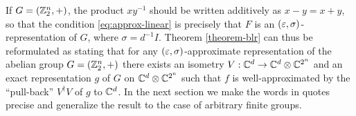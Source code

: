 If  $G=(\mathbb{Z}_2^n,+)$, the product $xy^{-1}$ should be written additively as $x-y=x+y$, so that the condition \eqref{eq:approx-linear} is precisely that $F$ is an $(\varepsilon,\sigma)$-representation of $G$, where  $\sigma = d^{-1}I$. 
Theorem \ref{theorem-blr} can thus be reformulated as stating that for any $(\varepsilon,\sigma)$-approximate representation of the abelian group $G=(\mathbb{Z}_2^n,+)$ there exists an isometry $V:\mathbb{C}^d \to \mathbb{C}^d\otimes \mathbb{C}^{2^n}$ and an exact representation $g$ of $G$ on $\mathbb{C}^d \otimes \mathbb{C}^{2^n}$ such that $f$ is well-approximated by the ``pull-back'' $V^\dagger V$ of $g$ to $\mathbb{C}^d$. In the next section we make the words in quotes precise and generalize the result to the case of arbitrary finite groups.  








